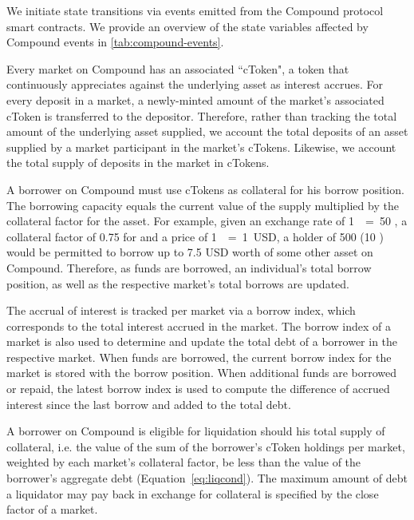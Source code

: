 

We initiate state transitions via events emitted from the Compound protocol smart contracts.
We provide an overview of the state variables affected by Compound events in \autoref{tab:compound-events}.

Every market on Compound has an associated ``cToken", a token that continuously appreciates against the underlying asset as interest accrues.
For every deposit in a market, a newly-minted amount of the market's associated cToken is transferred to the depositor.
Therefore, rather than tracking the total amount of the underlying asset supplied, we account the total deposits of an asset supplied by a market participant in the market's cTokens.
Likewise, we account the total supply of deposits in the market in cTokens.


A borrower on Compound must use cTokens as collateral for his borrow position.
The borrowing capacity equals the current value of the supply multiplied by the collateral factor for the asset.
For example, given an exchange rate of 1~~=~50 , a collateral factor of 0.75 for  and a price of 1~~=~1~USD, a holder of 500  (10 ) would be permitted to borrow up to 7.5 USD worth of some other asset on Compound. 
Therefore, as funds are borrowed, an individual's total borrow position, as well as the respective market's total borrows are updated.

The accrual of interest is tracked per market via a borrow index, which corresponds to the total interest accrued in the market.
The borrow index of a market is also used to determine and update the total debt of a borrower in the respective market.
When funds are borrowed, the current borrow index for the market is stored with the borrow position.
When additional funds are borrowed or repaid, the latest borrow index is used to compute the difference of accrued interest since the last borrow and added to the total debt.

A borrower on Compound is eligible for liquidation should his total supply of collateral, i.e. the value of the sum of the borrower's cToken holdings per market, weighted by each market's collateral factor, be less than the value of the borrower's aggregate debt (Equation~\eqref{eq:liqcond}).
The maximum amount of debt a liquidator may pay back in exchange for collateral is specified by the close factor of a market.
